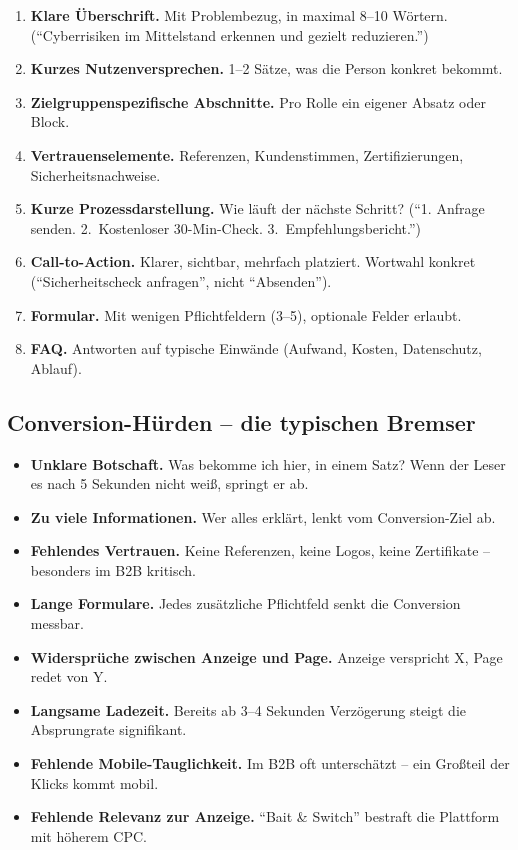\documentclass[11pt,a4paper,oneside]{article}
\newcommand{\fachbegriff}[1]{\textbf{#1}}
\begin{document}
\begin{enumerate}
  \item \fachbegriff{Klare Überschrift.} Mit Problembezug, in maximal 8--10 Wörtern. (``Cyberrisiken im Mittelstand erkennen und gezielt reduzieren.'')
  \item \fachbegriff{Kurzes Nutzenversprechen.} 1--2 Sätze, was die Person konkret bekommt.
  \item \fachbegriff{Zielgruppenspezifische Abschnitte.} Pro Rolle ein eigener Absatz oder Block.
  \item \fachbegriff{Vertrauenselemente.} Referenzen, Kundenstimmen, Zertifizierungen, Sicherheitsnachweise.
  \item \fachbegriff{Kurze Prozessdarstellung.} Wie läuft der nächste Schritt? (``1. Anfrage senden. 2.\ Kostenloser 30-Min-Check. 3.\ Empfehlungsbericht.'')
  \item \fachbegriff{Call-to-Action.} Klarer, sichtbar, mehrfach platziert. Wortwahl konkret (``Sicherheitscheck anfragen'', nicht ``Absenden'').
  \item \fachbegriff{Formular.} Mit wenigen Pflichtfeldern (3--5), optionale Felder erlaubt.
  \item \fachbegriff{FAQ.} Antworten auf typische Einwände (Aufwand, Kosten, Datenschutz, Ablauf).
\end{enumerate}

\subsection{Conversion-Hürden -- die typischen Bremser}

\begin{itemize}
  \item \textbf{Unklare Botschaft.} Was bekomme ich hier, in einem Satz? Wenn der Leser es nach 5 Sekunden nicht weiß, springt er ab.
  \item \textbf{Zu viele Informationen.} Wer alles erklärt, lenkt vom Conversion-Ziel ab.
  \item \textbf{Fehlendes Vertrauen.} Keine Referenzen, keine Logos, keine Zertifikate -- besonders im B2B kritisch.
  \item \textbf{Lange Formulare.} Jedes zusätzliche Pflichtfeld senkt die Conversion messbar.
  \item \textbf{Widersprüche zwischen Anzeige und Page.} Anzeige verspricht X, Page redet von Y.
  \item \textbf{Langsame Ladezeit.} Bereits ab 3--4 Sekunden Verzögerung steigt die Absprungrate signifikant.
  \item \textbf{Fehlende Mobile-Tauglichkeit.} Im B2B oft unterschätzt -- ein Großteil der Klicks kommt mobil.
  \item \textbf{Fehlende Relevanz zur Anzeige.} ``Bait \& Switch'' bestraft die Plattform mit höherem CPC.
\end{itemize}
\end{document}
